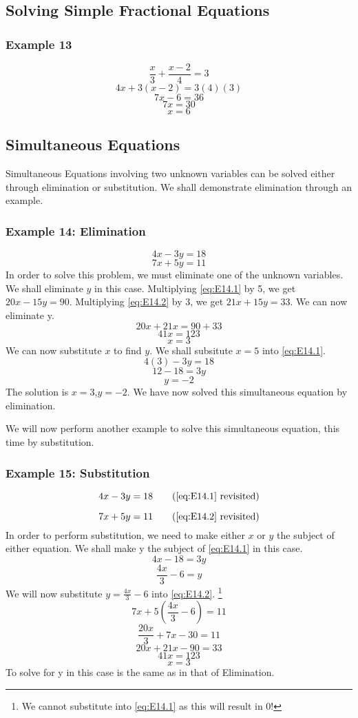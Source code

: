 \documentclass{report}
\begin{document}
\begin{flushleft}
\subsection{Solving Simple Fractional Equations}
\subsubsection{Example 13}
\[
\frac{x}{3}+\frac{x-2}{4}=3
\]
\[
4x+3(x-2)=3(4)(3)
\]
\[
7x-6=36
\]
\[
7x=30
\]
\[
x=6
\]
\subsection{Simultaneous Equations}
Simultaneous Equations involving two unknown variables can be solved either through elimination or substitution. We shall demonstrate elimination through an example.

\subsubsection{Example 14: Elimination}
\begin{equation} \label{eq:E14.1}
    4x-3y=18 
\end{equation}
\begin{equation}  \label{eq:E14.2}
    7x+5y=11
\end{equation}
In order to solve this problem, we must eliminate one of the unknown variables. We shall eliminate $y$ in this case. Multiplying \ref{eq:E14.1} by 5, we get $20x-15y=90$. Multiplying \ref{eq:E14.2} by 3, we get $21x+15y=33$. We can now eliminate y.
\[
    20x+21x=90+33
\]
\[
41x=123
\]
\[
x=3
\]
We can now substitute $x$ to find $y$. We shall subsitute $x=5$ into \ref{eq:E14.1}.
\[
    4(3)-3y=18
\]
\[
12-18=3y
\]
\[
y=-2
\]
The solution is $x=3$,$y=-2$. We have now solved this simultaneous equation by elimination.
\newline
\newline

We will now perform another example to solve this simultaneous equation, this time by substitution.
\subsubsection{Example 15: Substitution}

\begin{equation}
4x-3y=18 \tag{\ref{eq:E14.1} revisited}
\end{equation}

\begin{equation*}
7x+5y=11 \tag{\ref{eq:E14.2} revisited}
\end{equation*}
In order to perform substitution, we need to make either $x$ or $y$ the subject of either equation. We shall make y the subject of \ref{eq:E14.1} in this case.
\[
4x-18=3y
\]
\begin{equation}
    \frac{4x}{3}-6=y
\end{equation}
We will now substitute $y=\frac{4x}{3}-6$ into \ref{eq:E14.2}.
\footnote{We cannot substitute into \ref{eq:E14.1} as this will result in 0!}
\[
7x+5\left(\frac{4x}{3}-6\right)=11
\]
\[
\frac{20x}{3}+7x-30=11
\]
\[
20x+21x-90=33
\]
\[
41x=123
\]
\[
x=3
\]
To solve for y in this case is the same as in that of Elimination.

\end{flushleft}
\end{document}
